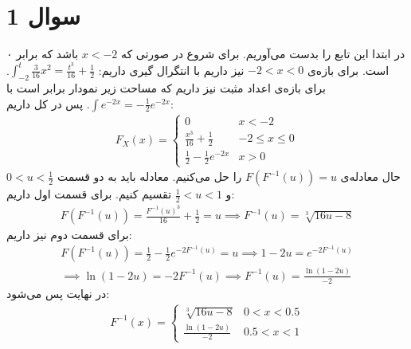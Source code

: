 \section*{سوال 1}
در ابتدا
این تابع را بدست می‌آوریم.
برای شروع در صورتی که
$x < -2$
باشد که
برابر ۰ است. برای بازه‌ی
$-2 < x < 0$
نیز داریم با انتگرال گیری داریم:
$\int^{t}_{-2} \frac{3}{16}x^2 = \frac{t^3}{16} + \frac{1}{2}$.
برای بازه‌ی اعداد مثبت نیز داریم که مساحت زیر نمودار
برابر است با
$\int e^{-2x} = -\frac{1}{2} e^{-2x}$.
پس در کل داریم:
\begin{gather*}
    F_X(x) = \begin{cases}
        0  & x < -2 \\
        \frac{x^3}{16} + \frac{1}{2} & -2 \le x \le 0\\
        \frac{1}{2} - \frac{1}{2} e^{-2x} & x > 0
      \end{cases}
\end{gather*}
حال معادله‌ی $F(F^{-1}(u)) = u$ را حل می‌کنیم.
معادله باید به دو قسمت
$0 < u < \frac{1}{2}$ و $\frac{1}{2} < u < 1$
تقسیم کنیم. برای قسمت اول داریم:
\begin{gather*}
    F(F^{-1}(u)) = \frac{F^{-1}(u)^3}{16} + \frac{1}{2} = u \implies F^{-1}(u) = \sqrt[3]{16u - 8}
\end{gather*}
برای قسمت دوم نیز داریم:
\begin{gather*}
    F(F^{-1}(u)) = \frac{1}{2} - \frac{1}{2} e^{-2F^{-1}(u)} = u \implies 1 - 2u = e^{-2F^{-1}(u)}\\
    \implies \ln(1 - 2u) = -2F^{-1}(u) \implies F^{-1}(u) = \frac{\ln(1 - 2u)}{-2}
\end{gather*}
در نهایت پس می‌شود:
\begin{gather*}
    F^{-1}(x) = \begin{cases}
        \sqrt[3]{16u - 8} & 0 < x < 0.5\\
        \frac{\ln(1 - 2u)}{-2} & 0.5 < x < 1
      \end{cases}
\end{gather*}